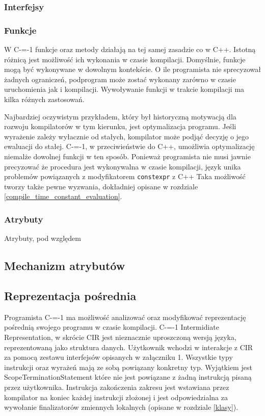 \subsubsection{Interfejsy}
\subsubsection{Funkcje}
W C-=-1 funkcje oraz metody działają na tej samej zasadzie co w C++.
Istotną różnicą jest możliwość ich wykonania w czasie kompilacji.
Domyślnie, funkcje mogą być wykonywane w dowolnym kontekście.
O ile programista nie sprecyzował żadnych ograniczeń, podprogram może zostać wykonany zarówno w czasie uruchomienia jak i kompilacji.
Wywoływanie funkcji w trakcie kompilacji ma kilka różnych zastosowań.

Najbardziej oczywistym przykładem, który był historyczną motywacją dla rozwoju kompilatorów w tym kierunku, jest optymalizacja programu.
Jeśli wyrażenie zależy wyłacznie od stałych, kompilator może podjąć decyzję o jego ewaluacji do stałej.
C-=-1, w przeciwieństwie do C++, umożliwia optymalizację niemalże dowolnej funkcji w ten sposób.
Ponieważ programista nie musi jawnie precyzować że procedura jest wykonywalna w czasie kompilacji, język unika problemów powiązanych z modyfikatorem \lstinline{constexpr} z C++ \cite{Klimiankou:contexpr_great_good_wrong_idea}
Taka możliwość tworzy także pewne wyzwania, dokładniej opisane w rozdziale \ref{compile_time_constant_evaluation}.

\subsubsection{Atrybuty}

Atrybuty, pod względem 
\subsection{Mechanizm atrybutów}
\subsection{Reprezentacja pośrednia}\label{reprezentacja_posrednia}
Programista C-=-1 ma możliwość analizować oraz modyfikować reprezentację pośrednią swojego programu w czasie kompilacji. C-=-1 Intermidiate Representation, w skrócie CIR jest nieznacznie uproszczoną wersją języka, reprezentowaną jako struktura danych.
Użytkownik wchodzi w interakcje z CIR za pomocą zestawu interfejsów opisanych w załączniku 1. Wszystkie typy instrukcji oraz wyrażeń mają ze sobą powiązany konkretny typ. Wyjątkiem jest ScopeTerminationStatement które nie jest powiązane z żadną instrukcją pisaną przez użytkownika. Instrukcja zakończenia zakresu jest wstawiana przez kompilator na koniec każdej instrukcji złożonej i jest odpowiedzialna za wywołanie finalizatorów zmiennych lokalnych (opisane w rozdziale \ref{klasy}).
